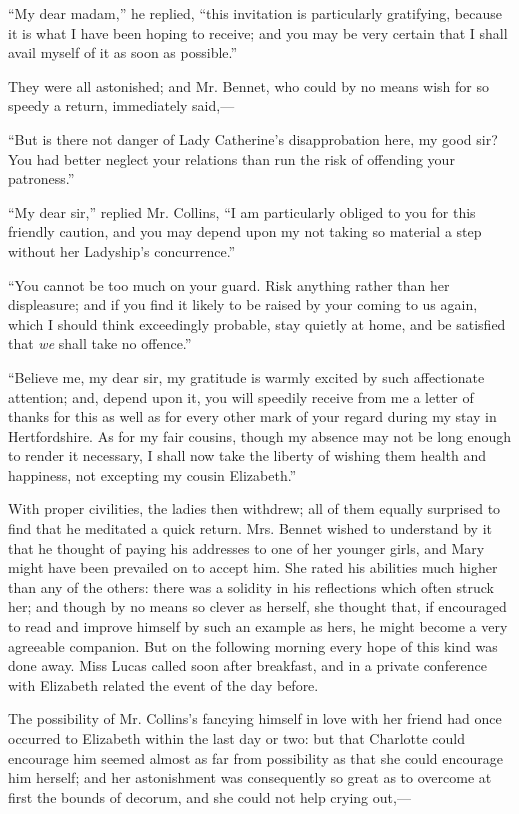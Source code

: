 \documentclass[12pt,openright]{book}
\begin{document}
“My dear madam,” he replied, “this invitation is particularly gratifying, because it is what I have been hoping to receive; and you may be very certain that I shall avail myself of it as soon as possible.”

They were all astonished; and Mr. Bennet, who could by no means wish for so speedy a return, immediately said,—

“But is there not danger of Lady Catherine’s disapprobation here, my good sir? You had better neglect your relations than run the risk of offending your patroness.”

“My dear sir,” replied Mr. Collins, “I am particularly obliged to you for this friendly caution, and you may depend upon my not taking so material a step without her Ladyship’s concurrence.”

“You cannot be too much on your guard. Risk anything rather than her displeasure; and if you find it likely to be raised by your coming to us again, which I should think exceedingly probable, stay quietly at home, and be satisfied that \textit{we} shall take no offence.”

“Believe me, my dear sir, my gratitude is warmly excited by such affectionate attention; and, depend upon it, you will speedily receive from me a letter of thanks for this as well as for every other mark of your regard during my stay in Hertfordshire. As for my fair cousins, though my absence may not be long enough to render it necessary, I shall now take the liberty of wishing them health and happiness, not excepting my cousin Elizabeth.”

With proper civilities, the ladies then withdrew; all of them equally surprised to find that he meditated a quick return. Mrs. Bennet wished to understand by it that he thought of paying his addresses to one of her younger girls, and Mary might have been prevailed on to accept him. She rated his abilities much higher than any of the others: there was a solidity in his reflections which often struck her; and though by no means so clever as herself, she thought that, if encouraged to read and improve himself by such an example as hers, he might become a very agreeable companion. But on the following morning every hope of this kind was done away. Miss Lucas called soon after breakfast, and in a private conference with Elizabeth related the event of the day before.

The possibility of Mr. Collins’s fancying himself in love with her friend had once occurred to Elizabeth within the last day or two: but that Charlotte could encourage him seemed almost as far from possibility as that she could encourage him herself; and her astonishment was consequently so great as to overcome at first the bounds of decorum, and she could not help crying out,—
\end{document}
